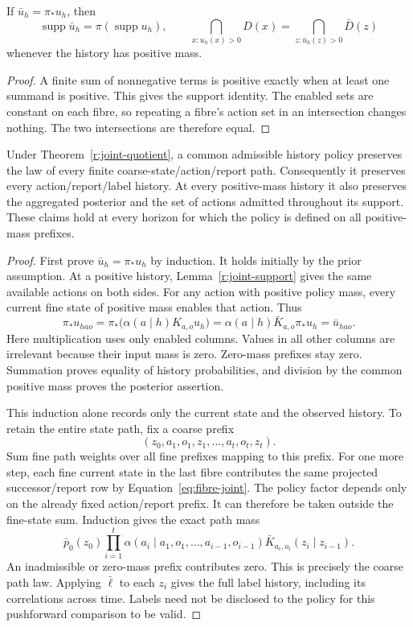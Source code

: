 \begin{lemma}\label{r:joint-support}
If $\bar u_h=\pi_*u_h$, then
\[
 \operatorname{supp}\bar u_h=\pi(\operatorname{supp}u_h),\qquad
 \bigcap_{x:u_h(x)>0}D(x)=\bigcap_{z:\bar u_h(z)>0}\bar D(z)
\]
whenever the history has positive mass.
\end{lemma}
\begin{proof}
A finite sum of nonnegative terms is positive exactly when at least one summand is positive. This gives the support identity. The enabled sets are constant on each fibre, so repeating a fibre's action set in an intersection changes nothing. The two intersections are therefore equal.
\end{proof}

\begin{theorem}\label{r:joint-history}
Under Theorem~\ref{r:joint-quotient}, a common admissible history policy preserves the law of every finite coarse-state/action/report path. Consequently it preserves every action/report/label history. At every positive-mass history it also preserves the aggregated posterior and the set of actions admitted throughout its support. These claims hold at every horizon for which the policy is defined on all positive-mass prefixes.
\end{theorem}
\begin{proof}
First prove $\bar u_h=\pi_*u_h$ by induction. It holds initially by the prior assumption. At a positive history, Lemma~\ref{r:joint-support} gives the same available actions on both sides. For any action with positive policy mass, every current fine state of positive mass enables that action. Thus
\[
 \pi_*u_{hao}
 =\pi_*\bigl(\alpha(a\mid h)K_{a,o}u_h\bigr)
 =\alpha(a\mid h)\bar K_{a,o}\pi_*u_h
 =\bar u_{hao}.
\]
Here multiplication uses only enabled columns. Values in all other columns are irrelevant because their input mass is zero. Zero-mass prefixes stay zero. Summation proves equality of history probabilities, and division by the common positive mass proves the posterior assertion.

This induction alone records only the current state and the observed history. To retain the entire state path, fix a coarse prefix
\[
 (z_0,a_1,o_1,z_1,\ldots,a_t,o_t,z_t).
\]
Sum fine path weights over all fine prefixes mapping to this prefix. For one more step, each fine current state in the last fibre contributes the same projected successor/report row by Equation~\eqref{eq:fibre-joint}. The policy factor depends only on the already fixed action/report prefix. It can therefore be taken outside the fine-state sum. Induction gives the exact path mass
\[
 \bar p_0(z_0)\prod_{i=1}^{t}
 \alpha(a_i\mid a_1,o_1,\ldots,a_{i-1},o_{i-1})
 \bar K_{a_i,o_i}(z_i\mid z_{i-1}).
\]
An inadmissible or zero-mass prefix contributes zero. This is precisely the coarse path law. Applying $\bar\ell$ to each $z_i$ gives the full label history, including its correlations across time. Labels need not be disclosed to the policy for this pushforward comparison to be valid.
\end{proof}

